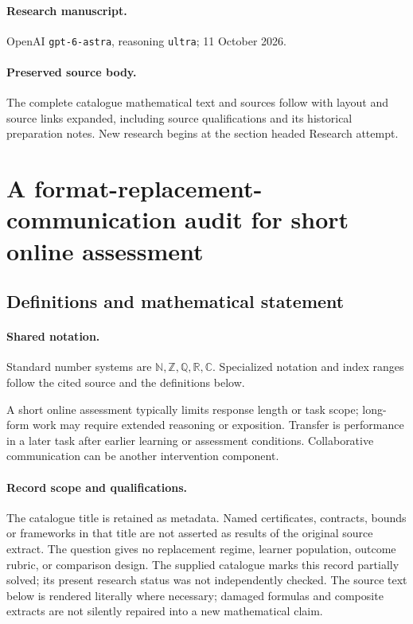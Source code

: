 \documentclass[11pt]{article}
\begin{document}
\paragraph{Research manuscript.} OpenAI \texttt{gpt-6-astra}, reasoning \texttt{ultra}; 11 October 2026.
\paragraph{Preserved source body.} The complete catalogue mathematical text and sources follow with layout and source links expanded, including source qualifications and its historical preparation notes. New research begins at the section headed Research attempt.

\section{A format-replacement-communication audit for short online assessment}\label{statement}

\subsection{Definitions and mathematical statement}

\paragraph{Shared notation.}Standard number systems are $\mathbb N,\mathbb Z,\mathbb Q,\mathbb R,\mathbb C$. Specialized notation and index ranges follow the cited source and the definitions below.


A short online assessment typically limits response length or task scope; long-form work may require extended reasoning or exposition. Transfer is performance in a later task after earlier learning or assessment conditions. Collaborative communication can be another intervention component.
\paragraph{Record scope and qualifications.}
The catalogue title is retained as metadata. Named certificates, contracts, bounds or frameworks in that title are not asserted as results of the original source extract.
The question gives no replacement regime, learner population, outcome rubric, or comparison design. The supplied catalogue marks this record partially solved; its present research status was not independently checked.
The source text below is rendered literally where necessary; damaged formulas and composite extracts are not silently repaired into a new mathematical claim.
\end{document}
